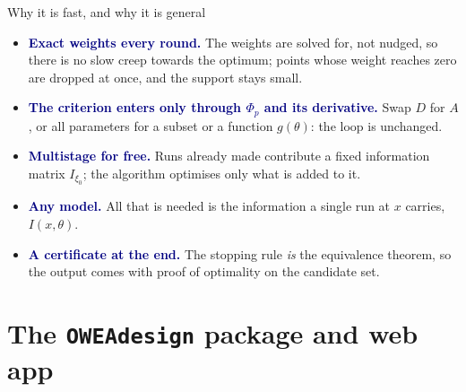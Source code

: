 \documentclass[aspectratio=169,10pt]{beamer}
\newcommand{\key}[1]{\textcolor{navy}{\textbf{#1}}}
\begin{document}
\begin{frame}{Why it is fast, and why it is general}
  \begin{itemize}\setlength{\itemsep}{0.7em}
    \item \key{Exact weights every round.} The weights are solved for, not nudged, so there is no slow creep towards the optimum;
          points whose weight reaches zero are dropped at once, and the support stays small.
    \item \key{The criterion enters only through $\Phi_p$ and its derivative.} Swap $D$ for $A$, or all parameters for a subset or a
          function $g(\theta)$: the loop is unchanged.
    \item \key{Multistage for free.} Runs already made contribute a fixed information matrix $I_{\xi_0}$; the algorithm optimises
          only what is added to it.
    \item \key{Any model.} All that is needed is the information a single run at $x$ carries, $I(x,\theta)$.
    \item \key{A certificate at the end.} The stopping rule \emph{is} the equivalence theorem, so the output comes with proof of
          optimality on the candidate set.
  \end{itemize}
\end{frame}

\section{The \texttt{OWEAdesign} package and web app}
\end{document}
